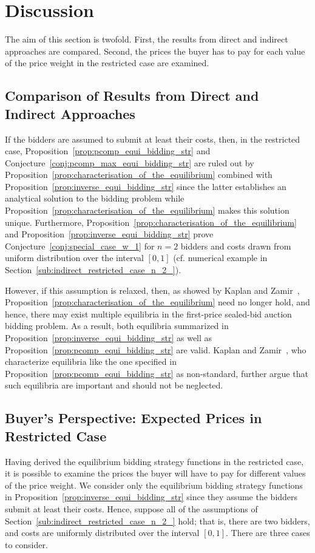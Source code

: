 \section{Discussion} %
\label{sec:discussion}
The aim of this section is twofold. First, the results from direct and indirect approaches are compared. Second, the prices the buyer has to pay for each value of the price weight in the restricted case are examined.

\subsection{Comparison of Results from Direct and Indirect Approaches} %
\label{sub:comparison_of_results_from_direct_and_indirect_approaches}
If the bidders are assumed to submit at least their costs, then, in the restricted case, Proposition~\ref{prop:pcomp_equi_bidding_str} and Conjecture~\ref{conj:pcomp_max_equi_bidding_str} are ruled out by Proposition~\ref{prop:characterisation_of_the_equilibrium} combined with Proposition~\ref{prop:inverse_equi_bidding_str} since the latter establishes an analytical solution to the bidding problem while Proposition~\ref{prop:characterisation_of_the_equilibrium} makes this solution unique. Furthermore, Proposition~\ref{prop:characterisation_of_the_equilibrium} and Proposition~\ref{prop:inverse_equi_bidding_str} prove Conjecture~\ref{conj:special_case_w_1} for $n=2$ bidders and costs drawn from uniform distribution over the interval $[0,1]$ (cf. numerical example in Section~\ref{sub:indirect_restricted_case_n_2_}).

However, if this assumption is relaxed, then, as showed by Kaplan and Zamir~\cite{KaplanZamir2011}, Proposition~\ref{prop:characterisation_of_the_equilibrium} need no longer hold, and hence, there may exist multiple equilibria in the first-price sealed-bid auction bidding problem. As a result, both equilibria summarized in Proposition~\ref{prop:inverse_equi_bidding_str} as well as Proposition~\ref{prop:pcomp_equi_bidding_str} are valid. Kaplan and Zamir~\cite{KaplanZamir2011}, who characterize equilibria like the one specified in Proposition~\ref{prop:pcomp_equi_bidding_str} as non-standard, further argue that such equilibria are important and should not be neglected.

\subsection{Buyer's Perspective: Expected Prices in Restricted Case} %
\label{sub:buyer_s_perspective_expected_prices_in_restricted_case}
Having derived the equilibrium bidding strategy functions in the restricted case, it is possible to examine the prices the buyer will have to pay for different values of the price weight. We consider only the equilibrium bidding strategy functions in Proposition~\ref{prop:inverse_equi_bidding_str} since they assume the bidders submit at least their costs. Hence, suppose all of the assumptions of Section~\ref{sub:indirect_restricted_case_n_2_} hold; that is, there are two bidders, and costs are uniformly distributed over the interval $[0,1]$. There are three cases to consider.

